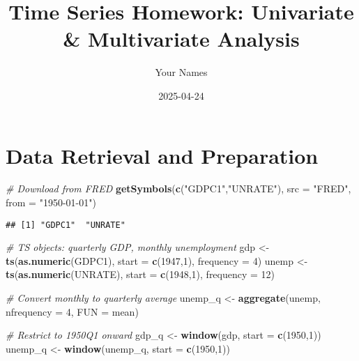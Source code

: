 \documentclass[
]{article}
\title{Time Series Homework: Univariate \& Multivariate Analysis}
\author{Your Names}
\date{2025-04-24}
\newenvironment{Shaded}{\begin{snugshade}}{\end{snugshade}}
\newcommand{\AttributeTok}[1]{\textcolor[rgb]{0.13,0.29,0.53}{#1}}
\newcommand{\CommentTok}[1]{\textcolor[rgb]{0.56,0.35,0.01}{\textit{#1}}}
\newcommand{\DecValTok}[1]{\textcolor[rgb]{0.00,0.00,0.81}{#1}}
\newcommand{\FunctionTok}[1]{\textcolor[rgb]{0.13,0.29,0.53}{\textbf{#1}}}
\newcommand{\NormalTok}[1]{#1}
\newcommand{\OtherTok}[1]{\textcolor[rgb]{0.56,0.35,0.01}{#1}}
\newcommand{\StringTok}[1]{\textcolor[rgb]{0.31,0.60,0.02}{#1}}
\begin{document}
\maketitle

{
\setcounter{tocdepth}{3}
\tableofcontents
}
\hypertarget{data-retrieval-and-preparation}{%
\section{Data Retrieval and
Preparation}\label{data-retrieval-and-preparation}}

\begin{Shaded}
\begin{Highlighting}[]
\CommentTok{\# Download from FRED}
\FunctionTok{getSymbols}\NormalTok{(}\FunctionTok{c}\NormalTok{(}\StringTok{"GDPC1"}\NormalTok{,}\StringTok{"UNRATE"}\NormalTok{), }\AttributeTok{src =} \StringTok{"FRED"}\NormalTok{, }\AttributeTok{from =} \StringTok{"1950{-}01{-}01"}\NormalTok{)}
\end{Highlighting}
\end{Shaded}

\begin{verbatim}
## [1] "GDPC1"  "UNRATE"
\end{verbatim}

\begin{Shaded}
\begin{Highlighting}[]
\CommentTok{\# TS objects: quarterly GDP, monthly unemployment}
\NormalTok{gdp     }\OtherTok{\textless{}{-}} \FunctionTok{ts}\NormalTok{(}\FunctionTok{as.numeric}\NormalTok{(GDPC1), }\AttributeTok{start =} \FunctionTok{c}\NormalTok{(}\DecValTok{1947}\NormalTok{,}\DecValTok{1}\NormalTok{), }\AttributeTok{frequency =} \DecValTok{4}\NormalTok{)}
\NormalTok{unemp   }\OtherTok{\textless{}{-}} \FunctionTok{ts}\NormalTok{(}\FunctionTok{as.numeric}\NormalTok{(UNRATE), }\AttributeTok{start =} \FunctionTok{c}\NormalTok{(}\DecValTok{1948}\NormalTok{,}\DecValTok{1}\NormalTok{), }\AttributeTok{frequency =} \DecValTok{12}\NormalTok{)}

\CommentTok{\# Convert monthly to quarterly average}
\NormalTok{unemp\_q }\OtherTok{\textless{}{-}} \FunctionTok{aggregate}\NormalTok{(unemp, }\AttributeTok{nfrequency =} \DecValTok{4}\NormalTok{, }\AttributeTok{FUN =}\NormalTok{ mean)}

\CommentTok{\# Restrict to 1950Q1 onward}
\NormalTok{gdp\_q   }\OtherTok{\textless{}{-}} \FunctionTok{window}\NormalTok{(gdp,   }\AttributeTok{start =} \FunctionTok{c}\NormalTok{(}\DecValTok{1950}\NormalTok{,}\DecValTok{1}\NormalTok{))}
\NormalTok{unemp\_q }\OtherTok{\textless{}{-}} \FunctionTok{window}\NormalTok{(unemp\_q, }\AttributeTok{start =} \FunctionTok{c}\NormalTok{(}\DecValTok{1950}\NormalTok{,}\DecValTok{1}\NormalTok{))}
\end{Highlighting}
\end{Shaded}
\end{document}
